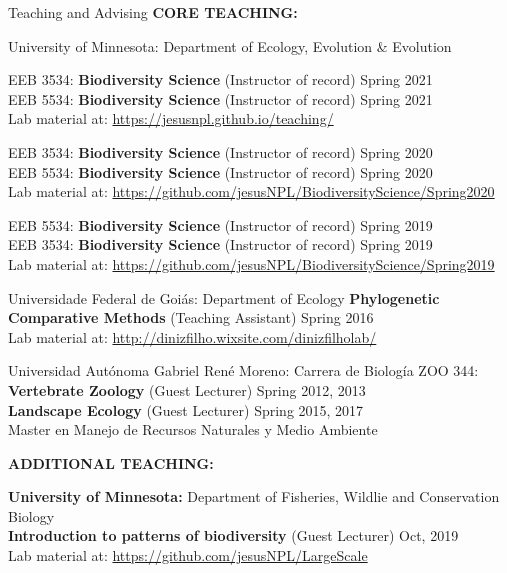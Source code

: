 \documentclass{resume} %
\begin{document}
\begin{rSection}{Teaching and Advising}
\textbf{CORE TEACHING:}

\begin{reSubsection}{University of Minnesota: }{Department of Ecology, Evolution \& Evolution }{}{
EEB 3534: \textbf{Biodiversity Science} (Instructor of record) \hfill Spring 2021 \\ 
EEB 5534: \textbf{Biodiversity Science} (Instructor of record) \hfill Spring 2021 \\ 
{Lab material at:
\url{https://jesusnpl.github.io/teaching/}} \smallskip

EEB 3534: \textbf{Biodiversity Science} (Instructor of record) \hfill Spring 2020 \\ 
EEB 5534: \textbf{Biodiversity Science} (Instructor of record) \hfill Spring 2020 \\ 
{Lab material at:
\url{https://github.com/jesusNPL/BiodiversityScience/Spring2020}} \smallskip 

EEB 5534: \textbf{Biodiversity Science} (Instructor of record) \hfill Spring 2019 \\  
EEB 3534: \textbf{Biodiversity Science} (Instructor of record) \hfill Spring 2019 \\ 
{Lab material at:
\url{https://github.com/jesusNPL/BiodiversityScience/Spring2019}} \smallskip 
}
\end{reSubsection}

\begin{reSubsection}{Universidade Federal de Goiás: }{Department of Ecology }{}{
\textbf{Phylogenetic Comparative Methods} (Teaching Assistant) \hfill Spring 2016 \\ 
{Lab material at:
\url{http://dinizfilho.wixsite.com/dinizfilholab/}} \smallskip 
} 
\end{reSubsection}

\begin{reSubsection}{Universidad Autónoma Gabriel René Moreno: }{Carrera de Biología }{}{
ZOO 344: \textbf{Vertebrate Zoology} (Guest Lecturer) \hfill Spring 2012, 2013 \\ \textbf{Landscape Ecology} (Guest Lecturer) \hfill Spring 2015, 2017 \\
{Master en Manejo de Recursos Naturales y Medio Ambiente} \smallskip 
} 
\end{reSubsection}

\textbf{ADDITIONAL TEACHING:}

{\bf University of Minnesota: }{Department of Fisheries, Wildlie and Conservation Biology } \\
\textbf{Introduction to patterns of biodiversity} (Guest Lecturer) \hfill Oct, 2019 \\
{Lab material at:
\url{https://github.com/jesusNPL/LargeScale}}\smallskip 


\end{rSection}
\end{document}
